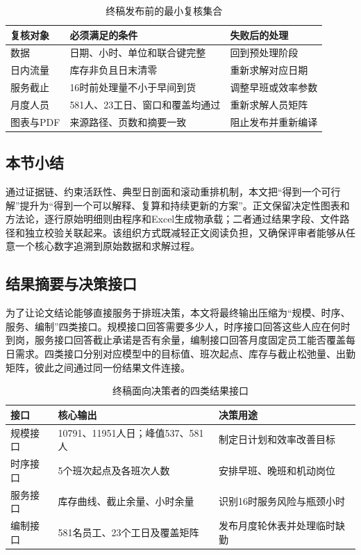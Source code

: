 \begin{table}[htbp]
\centering
\caption{终稿发布前的最小复核集合}
\label{tab:release-check}
\begin{tabular}{p{}p{}p{}}
\toprule
复核对象 & 必须满足的条件 & 失败后的处理\\
\midrule
数据 & 日期、小时、单位和联合键完整 & 回到预处理阶段\\
日内流量 & 库存非负且日末清零 & 重新求解对应日期\\
服务截止 & 16时前处理量不小于早间到货 & 调整早班或效率参数\\
月度人员 & 581人、23工日、窗口和覆盖均通过 & 重新求解人员矩阵\\
图表与PDF & 来源路径、页数和摘要一致 & 阻止发布并重新编译\\
\bottomrule
\end{tabular}
\end{table}

\subsection{本节小结}

通过证据链、约束活跃性、典型日剖面和滚动重排机制，本文把“得到一个可行解”提升为“得到一个可以解释、复算和持续更新的方案”。正文保留决定性图表和方法论，逐行原始明细则由程序和Excel生成物承载；二者通过结果字段、文件路径和独立校验关联起来。该组织方式既减轻正文阅读负担，又确保评审者能够从任意一个核心数字追溯到原始数据和求解过程。

\clearpage
\subsection{结果摘要与决策接口}

为了让论文结论能够直接服务于排班决策，本文将最终输出压缩为“规模、时序、服务、编制”四类接口。规模接口回答需要多少人，时序接口回答这些人应在何时到岗，服务接口回答截止承诺是否有余量，编制接口回答月度固定员工能否覆盖每日需求。四类接口分别对应模型中的目标值、班次起点、库存与截止松弛量、出勤矩阵，彼此之间通过同一份结果文件连接。

\begin{table}[htbp]
\centering
\caption{终稿面向决策者的四类结果接口}
\label{tab:decision-summary}
\begin{tabular}{p{}p{}p{}}
\toprule
接口 & 核心输出 & 决策用途\\
\midrule
规模接口 & 10791、11951人日；峰值537、581人 & 制定日计划和效率改善目标\\
时序接口 & 5个班次起点及各班次人数 & 安排早班、晚班和机动岗位\\
服务接口 & 库存曲线、截止余量、小时余量 & 识别16时服务风险与瓶颈小时\\
编制接口 & 581名员工、23个工日及覆盖矩阵 & 发布月度轮休表并处理临时缺勤\\
\bottomrule
\end{tabular}
\end{table}


